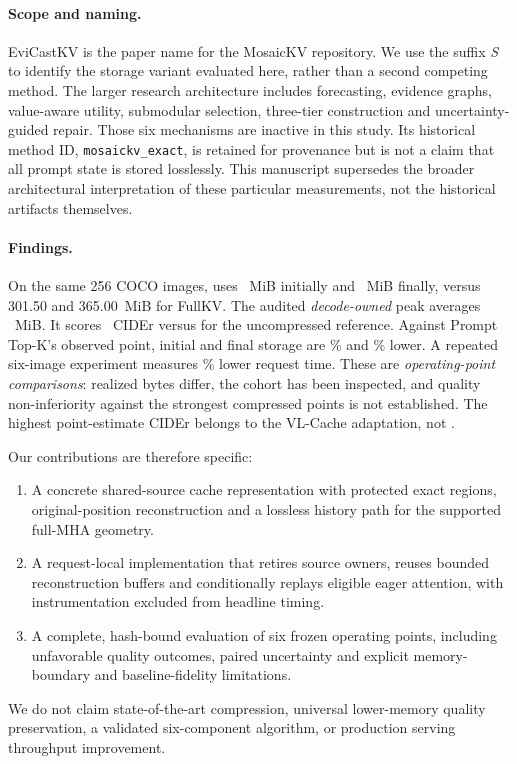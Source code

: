 \paragraph{Scope and naming.}
EviCastKV is the paper name for the MosaicKV repository. We use the suffix
\emph{S} to identify the storage variant evaluated here, rather than a
second competing method. The larger research architecture includes
forecasting, evidence graphs, value-aware utility, submodular selection,
three-tier construction and uncertainty-guided repair. Those six mechanisms
are inactive in this study. Its historical method ID,
\texttt{mosaickv\_exact}, is retained for provenance but is not a claim that
all prompt state is stored losslessly. This manuscript supersedes the
broader architectural interpretation of these particular measurements,
not the historical artifacts themselves.

\paragraph{Findings.}
On the same 256 COCO images, \Evi{} uses \EviInitial~MiB initially and
\EviFinal~MiB finally, versus 301.50 and 365.00~MiB for FullKV. The audited
\emph{decode-owned} peak averages \EviPeak~MiB. It scores
\EviCider~CIDEr versus \FullCider{} for the uncompressed reference.
Against Prompt Top-K's observed point, initial and final storage are
\TopInitialReduction\% and \TopFinalReduction\% lower. A repeated
six-image experiment measures \TopFaster\% lower request time. These are
\emph{operating-point comparisons}: realized bytes differ, the cohort has
been inspected, and quality non-inferiority against the strongest compressed
points is not established. The highest point-estimate CIDEr belongs to the
VL-Cache adaptation, not \Evi{}.

Our contributions are therefore specific:
\begin{enumerate}
\item A concrete shared-source cache representation with protected exact
regions, original-position reconstruction and a lossless history path for
the supported full-MHA geometry.
\item A request-local implementation that retires source owners, reuses
bounded reconstruction buffers and conditionally replays eligible eager
attention, with instrumentation excluded from headline timing.
\item A complete, hash-bound evaluation of six frozen operating points,
including unfavorable quality outcomes, paired uncertainty and explicit
memory-boundary and baseline-fidelity limitations.
\end{enumerate}
We do not claim state-of-the-art compression, universal lower-memory
quality preservation, a validated six-component algorithm, or production
serving throughput improvement.
